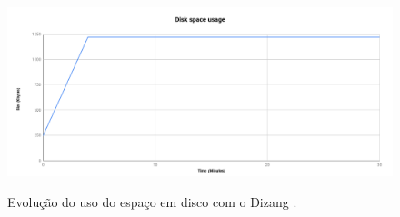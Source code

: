 \documentclass[conference]{IEEEtran}
\newcommand{\fancyname}{Dizang }
\begin{document}

\begin{figure}[htb!]
\footnotesize
\caption{Evolução do uso do espaço em disco com o \fancyname.}
\includegraphics[scale=0.42]{evolucao_coleta_ieee.png}
\centering
\label{fig:evolucao_coleta}
\end{figure}
\end{document}
